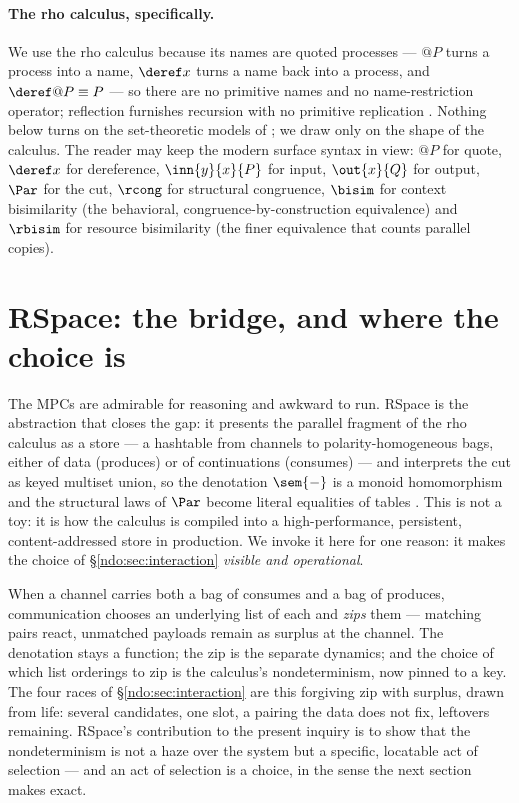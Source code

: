 \paragraph{The rho calculus, specifically.}
We use the rho calculus because its names are quoted processes --- $@P$ turns a
process into a name, $\deref x$ turns a name back into a process, and
$\deref @P \equiv P$ --- so there are no primitive names and no name-restriction
operator; reflection furnishes recursion with no primitive replication \cite{RHO}.
Nothing below turns on the set-theoretic models of \cite{qcs,knot}; we draw only on
the shape of the calculus. The reader may keep the modern surface syntax in view:
$@P$ for quote, $\deref x$ for dereference, $\inn{y}{x}{P}$ for input, $\out{x}{Q}$
for output, $\Par$ for the cut, $\rcong$ for structural congruence, $\bisim$ for
context bisimilarity (the behavioral, congruence-by-construction equivalence) and
$\rbisim$ for resource bisimilarity (the finer equivalence that counts parallel
copies).


\section{RSpace: the bridge, and where the choice is}\label{ndo:sec:rspace}

The MPCs are admirable for reasoning and awkward to run. RSpace is the abstraction
that closes the gap: it presents the parallel fragment of the rho calculus as a
store --- a hashtable from channels to polarity-homogeneous bags, either of data
(produces) or of continuations (consumes) --- and interprets the cut as keyed
multiset union, so the denotation $\sem{-}$ is a monoid homomorphism and the
structural laws of $\Par$ become literal equalities of tables \cite{qcs}. This is
not a toy: it is how the calculus is compiled into a high-performance, persistent,
content-addressed store in production. We invoke it here for one reason: it makes
the choice of \S\ref{ndo:sec:interaction} \emph{visible and operational}.

When a channel carries both a bag of consumes and a bag of produces, communication
chooses an underlying list of each and \emph{zips} them --- matching pairs react,
unmatched payloads remain as surplus at the channel. The denotation stays a
function; the zip is the separate dynamics; and the choice of which list orderings
to zip is the calculus's nondeterminism, now pinned to a key. The four races of
\S\ref{ndo:sec:interaction} are this forgiving zip with surplus, drawn from life:
several candidates, one slot, a pairing the data does not fix, leftovers remaining.
RSpace's contribution to the present inquiry is to show that the nondeterminism is
not a haze over the system but a specific, locatable act of selection --- and an act
of selection is a choice, in the sense the next section makes exact.

